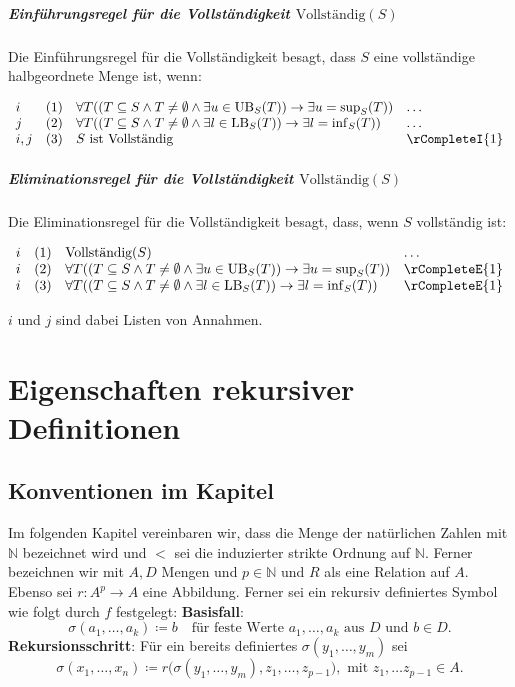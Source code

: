 \documentclass{book}
\theoremstyle{plain}
\theoremstyle{remark}
\theoremstyle{definition}
\begin{document}
\paragraph{Einführungsregel für die Vollständigkeit \(\text{Vollständig}(S)\)}
Die Einführungsregel für die Vollständigkeit besagt, dass \( S \) eine vollständige halbgeordnete Menge ist, wenn:

\[
\begin{array}{llll}
    i   & (1) & \forall T((T\subseteq S\land T \neq \emptyset\land \exists u \in \text{UB}_S(T)) \rightarrow \exists u = \sup_S(T)) & \dots \\
    j   & (2) & \forall T((T\subseteq S\land T \neq \emptyset\land \exists l \in \text{LB}_S(T)) \rightarrow \exists l = \inf_S(T)) & \dots \\
    i,j & (3) & S \text{ ist Vollständig} & \rCompleteI{1}
\end{array}
\]

\paragraph{Eliminationsregel für die Vollständigkeit \(\text{Vollständig}(S)\)}
Die Eliminationsregel für die Vollständigkeit besagt, dass, wenn \( S \) vollständig ist:

\[
\begin{array}{llll}
    i & (1) & \text{Vollständig}(S) & \dots \\
    i & (2) & \forall T((T\subseteq S\land T \neq \emptyset\land \exists u \in \text{UB}_S(T)) \rightarrow \exists u = \sup_S(T)) & \rCompleteE{1} \\
    i & (3) & \forall T((T\subseteq S\land T \neq \emptyset\land \exists l \in \text{LB}_S(T)) \rightarrow \exists l = \inf_S(T)) & \rCompleteE{1}
\end{array}
\]

\(i\) und \(j\) sind dabei Listen von Annahmen.


\chapter{Eigenschaften rekursiver Definitionen}
\section{Konventionen im Kapitel}
Im folgenden Kapitel vereinbaren wir, dass die Menge der natürlichen Zahlen mit \(\mathbb{N}\) bezeichnet wird und \(<\) sei die induzierter strikte Ordnung auf \(\mathbb{N}\). Ferner bezeichnen wir mit \(A, D\) Mengen und \(p\in\mathbb{N}\) und \(R\) als eine Relation auf \(A\). Ebenso sei \(r:A^p\rightarrow A\) eine Abbildung. Ferner sei ein rekursiv definiertes Symbol wie folgt durch \(f\) festgelegt:
\textbf{Basisfall}:
\[
    \sigma(a_1, \ldots, a_k) \coloneqq b \quad \text{für feste Werte } a_1, \ldots, a_k \text{ aus } D \text{ und } b\in D\text{.}
\]
\textbf{Rekursionsschritt}:
Für ein bereits definiertes \(\sigma(y_1, \ldots, y_m)\) sei
\[
    \sigma(x_1, \ldots, x_n) \coloneqq r\big(\sigma(y_1, \ldots, y_m), z_1, \ldots, z_{p-1}\big), \text{ mit } z_1,\ldots z_{p-1}\in A\text{.}
\]
\end{document}
